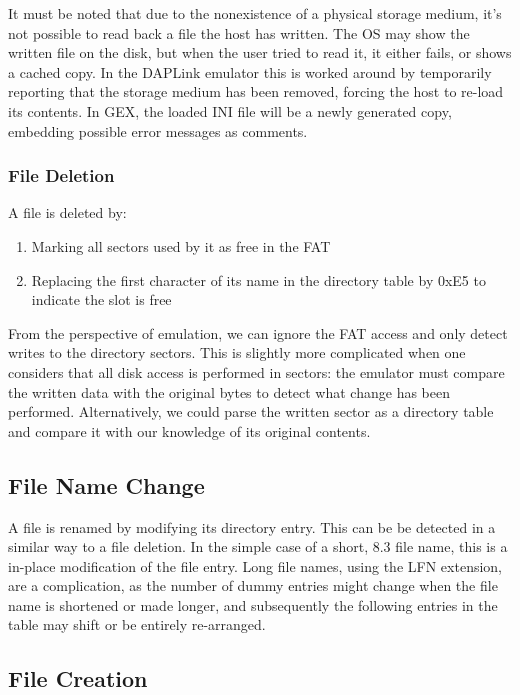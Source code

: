 It must be noted that due to the nonexistence of a physical storage medium, it's not possible to read back a file the host has written. The \gls{OS} may show the written file on the disk, but when the user tried to read it, it either fails, or shows a cached copy. In the DAPLink emulator this is worked around by temporarily reporting that the storage medium has been removed, forcing the host to re-load its contents. In GEX, the loaded INI file will be a newly generated copy, embedding possible error messages as comments.

\subsubsection{File Deletion}

A file is deleted by:

\begin{enumerate}
	\item Marking all sectors used by it as free in the \gls{FAT}
	\item Replacing the first character of its name in the directory table by 0xE5 to indicate the slot is free
\end{enumerate} 

From the perspective of emulation, we can ignore the \gls{FAT} access and only detect writes to the directory sectors. This is slightly more complicated when one considers that all disk access is performed in sectors: the emulator must compare the written data with the original bytes to detect what change has been performed. Alternatively, we could parse the written sector as a directory table and compare it with our knowledge of its original contents.

\subsection{File Name Change}

A file is renamed by modifying its directory entry. This can be be detected in a similar way to a file deletion. In the simple case of a short, 8.3 file name, this is a in-place modification of the file entry. Long file names, using the \gls{LFN} extension, are a complication, as the number of dummy entries might change when the file name is shortened or made longer, and subsequently the following entries in the table may shift or be entirely re-arranged.

\subsection{File Creation}

